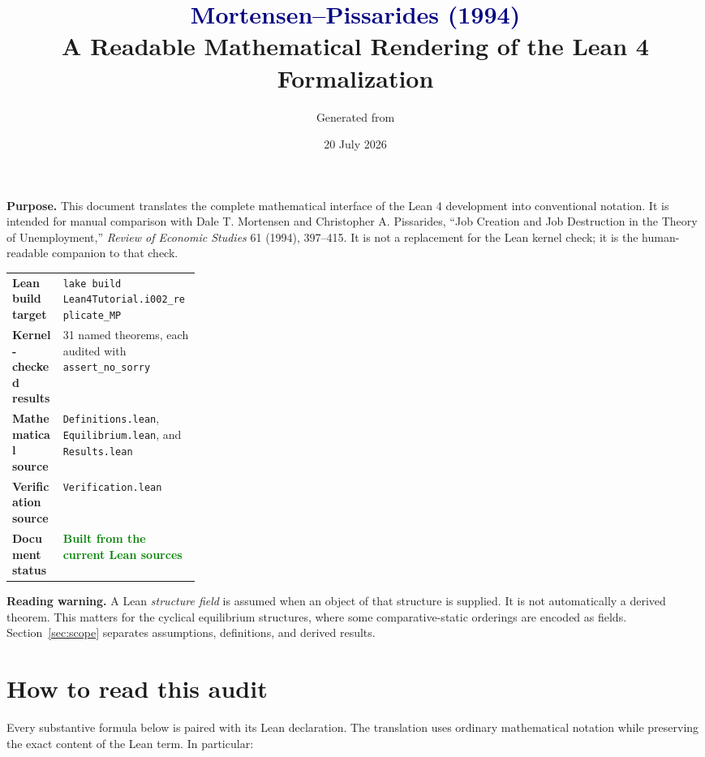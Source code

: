 \documentclass[11pt]{article}
\title{\vspace{-2em}\textcolor{navy}{\textbf{Mortensen--Pissarides (1994)}}\\[0.35em]
\Large A Readable Mathematical Rendering of the Lean 4 Formalization}
\author{Generated from \code{Lean4Tutorial.i002\_replicate\_MP}}
\date{20 July 2026}
\newcommand{\code}[1]{\texttt{#1}}
\newcommand{\leanfile}[1]{\texttt{#1}}
\newcommand{\status}[2]{\textcolor{#1}{\textbf{#2}}}
\begin{document}
\maketitle

\begin{center}
\colorbox{softgray}{\parbox{0.91\linewidth}{
\textbf{Purpose.} This document translates the complete mathematical interface of the
Lean 4 development into conventional notation. It is intended for manual comparison
with Dale T. Mortensen and Christopher A. Pissarides, ``Job Creation and Job
Destruction in the Theory of Unemployment,'' \emph{Review of Economic Studies}
61 (1994), 397--415. It is not a replacement for the Lean kernel check; it is the
human-readable companion to that check.
}}
\end{center}

\vfill
\begin{tabularx}{\linewidth}{@{}>{\bfseries}p{0.27\linewidth}X@{}}
Lean build target & \code{lake build Lean4Tutorial.i002\_replicate\_MP} \\
Kernel-checked results & 31 named theorems, each audited with \code{assert\_no\_sorry} \\
Mathematical source & \leanfile{Definitions.lean}, \leanfile{Equilibrium.lean}, and \leanfile{Results.lean} \\
Verification source & \leanfile{Verification.lean} \\
Document status & \status{green}{Built from the current Lean sources} \\
\end{tabularx}
\vfill

\textbf{Reading warning.} A Lean \emph{structure field} is assumed when an object of
that structure is supplied. It is not automatically a derived theorem. This matters
for the cyclical equilibrium structures, where some comparative-static orderings are
encoded as fields. Section~\ref{sec:scope} separates assumptions, definitions, and
derived results.

\newpage
\tableofcontents
\newpage

\section{How to read this audit}

Every substantive formula below is paired with its Lean declaration. The translation
uses ordinary mathematical notation while preserving the exact content of the Lean
term. In particular:
\end{document}
